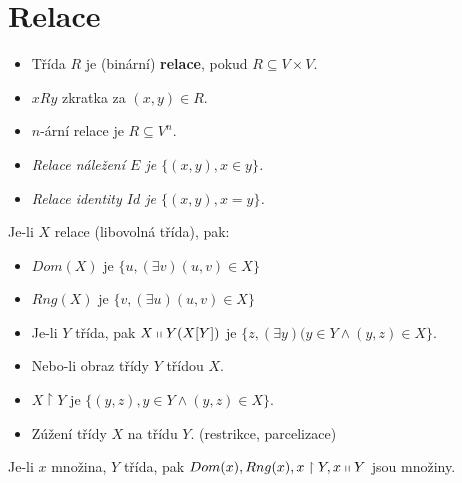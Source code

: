 \chapter{Relace}

\begin{definice}
	\begin{itemize}
		\item Třída $R$ je (binární) \textbf{relace}, pokud $R \subseteq V \times V$.
		\item $x R y$ zkratka za $(x,y) \in R$.
		\item $n$-ární relace je $R \subseteq V^{n}$.
	\end{itemize}
\end{definice}

\begin{prikl}
	\begin{itemize}
		\item \textit{Relace náležení $E$ je $\{(x,y), x \in y \}$.}
		\item \textit{Relace identity $Id$ je $\{(x,y),x = y \}$.}
	\end{itemize}
\end{prikl}

\begin{definice}
	Je-li $X$ relace (libovolná třída), pak:
	
	\begin{itemize}
		\item $Dom (X)$ je $\{u,(\exists v)(u,v) \in X\}$
		\item $Rng (X)$ je $\{v, (\exists u)(u,v) \in X\}$
		\item Je-li $Y$ třída, pak $X \shortparallel Y (X [Y])$ je $\{z, (\exists y)(y \in Y \land (y,z) \in X\}$.
		\item Nebo-li obraz třídy $Y$ třídou $X$.
		\item $X \upharpoonright Y$ je $\{(y,z), y \in Y \land (y,z) \in X\}$.
		\item Zúžení třídy $X$ na třídu $Y$. (restrikce, parcelizace)
	\end{itemize}
\end{definice}

\begin{lemma}
	Je-li $x$ množina, $Y$ třída, pak $Dom(x), Rng(x), x \upharpoonright Y, x \shortparallel Y$ jsou množiny.
\end{lemma}

